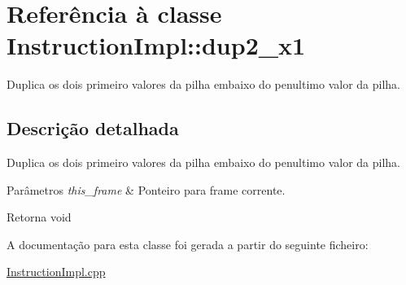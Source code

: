 \hypertarget{class_instruction_impl_1_1dup2__x1}{}\section{Referência à classe Instruction\+Impl\+:\+:dup2\+\_\+x1}
\label{class_instruction_impl_1_1dup2__x1}


Duplica os dois primeiro valores da pilha embaixo do penultimo valor da pilha.  




\subsection{Descrição detalhada}
Duplica os dois primeiro valores da pilha embaixo do penultimo valor da pilha. 


\begin{DoxyParams}{Parâmetros}
{\em this\+\_\+frame} & Ponteiro para frame corrente. \\
\hline
\end{DoxyParams}
\begin{DoxyReturn}{Retorna}
void 
\end{DoxyReturn}


A documentação para esta classe foi gerada a partir do seguinte ficheiro\+:\begin{DoxyCompactItemize}
\item 
\hyperlink{_instruction_impl_8cpp}{Instruction\+Impl.\+cpp}\end{DoxyCompactItemize}
